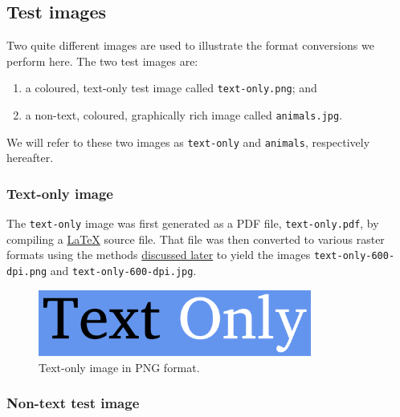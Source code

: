 \documentclass[
  11pt,
  british,
  a4paper,
]{article}
\providecommand{\tightlist}{%
  \setlength{\itemsep}{0pt}\setlength{\parskip}{0pt}}
\begin{document}
\hypertarget{test-images}{%
\subsection{Test images}\label{test-images}}

Two quite different images are used to illustrate the format conversions
we perform here. The two test images are:

\begin{enumerate}
\tightlist
\item
  a coloured, text-only test image called \texttt{text-only.png}; and
\item
  a non-text, coloured, graphically rich image called
  \texttt{animals.jpg}.
\end{enumerate}

We will refer to these two images as \texttt{text-only} and
\texttt{animals}, respectively hereafter.

\hypertarget{text-only-image}{%
\subsubsection{Text-only image}\label{text-only-image}}

The \texttt{text-only} image was first generated as a PDF file,
\texttt{text-only.pdf}, by compiling a
\href{https://www.latex-project.org/}{LaTeX} source file. That file was
then converted to various raster formats using the methods
\protect\hyperlink{vector-to-raster}{discussed later} to yield the
images \texttt{text-only-600-dpi.png} and
\texttt{text-only-600-dpi.jpg}.

\begin{figure}
\hypertarget{fig:text-only}{%
\centering
\includegraphics[width=0.8\textwidth,height=\textheight]{images/text-only-600-dpi-cairo.png}
\caption{Text-only image in PNG format.}\label{fig:text-only}
}
\end{figure}

\hypertarget{non-text-test-image}{%
\subsubsection{Non-text test image}\label{non-text-test-image}}
\end{document}
